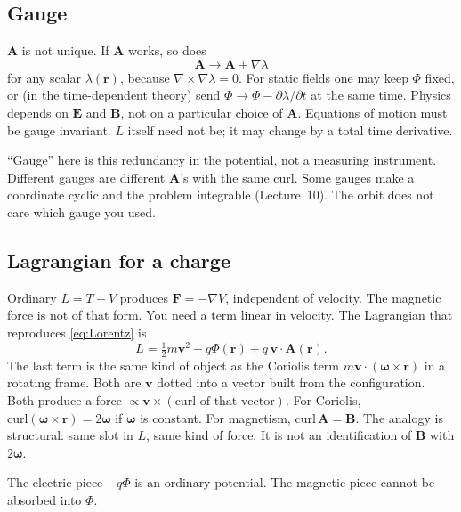\documentclass[11pt]{article}
\numberwithin{equation}{section}
\newcommand{\vect}[1]{\mathbf{#1}}
\begin{document}
\subsection{Gauge}

$\vect{A}$ is not unique. If $\vect{A}$ works, so does
\begin{equation}
\label{eq:gauge}
\vect{A}\to\vect{A}+\nabla\lambda
\end{equation}
for any scalar $\lambda(\vect{r})$, because $\nabla\times\nabla\lambda=0$. For static fields one may keep $\Phi$ fixed, or (in the time-dependent theory) send $\Phi\to\Phi-\partial\lambda/\partial t$ at the same time. Physics depends on $\vect{E}$ and $\vect{B}$, not on a particular choice of $\vect{A}$. Equations of motion must be gauge invariant. $L$ itself need not be; it may change by a total time derivative.

``Gauge'' here is this redundancy in the potential, not a measuring instrument. Different gauges are different $\vect{A}$'s with the same curl. Some gauges make a coordinate cyclic and the problem integrable (Lecture~10). The orbit does not care which gauge you used.

\subsection{Lagrangian for a charge}

Ordinary $L=T-V$ produces $\vect{F}=-\nabla V$, independent of velocity. The magnetic force is not of that form. You need a term linear in velocity. The Lagrangian that reproduces \eqref{eq:Lorentz} is
\begin{equation}
\label{eq:LEM}
L = \tfrac12 m \vect{v}^2 - q\Phi(\vect{r}) + q\,\vect{v}\cdot\vect{A}(\vect{r}).
\end{equation}
The last term is the same kind of object as the Coriolis term $m\vect{v}\cdot(\vect{\omega}\times\vect{r})$ in a rotating frame. Both are $\vect{v}$ dotted into a vector built from the configuration. Both produce a force $\propto\vect{v}\times(\mathrm{curl}\text{ of that vector})$. For Coriolis, $\mathrm{curl}(\vect{\omega}\times\vect{r})=2\vect{\omega}$ if $\vect{\omega}$ is constant. For magnetism, $\mathrm{curl}\,\vect{A}=\vect{B}$. The analogy is structural: same slot in $L$, same kind of force. It is not an identification of $\vect{B}$ with $2\vect{\omega}$.

The electric piece $-q\Phi$ is an ordinary potential. The magnetic piece cannot be absorbed into $\Phi$.
\end{document}
